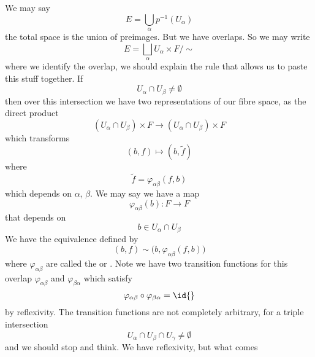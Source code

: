 We may say
\begin{equation}
E=\bigcup_{\alpha}p^{-1}(U_{\alpha})
\end{equation}
the total space is the union of preimages. But we have
overlaps. So we may write
\begin{equation}
E=\bigsqcup_{\alpha}U_{\alpha}\times F/\sim
\end{equation}
where we identify the overlap, we should explain the rule that
allows us to paste this stuff together. If
\begin{equation}
U_{\alpha}\cap U_{\beta}\not=\emptyset
\end{equation}
then over this intersection we have two representations of our
fibre space, as the direct product
\begin{equation}
(U_{\alpha}\cap U_{\beta})\times F\to (U_{\alpha}\cap U_{\beta})\times F
\end{equation}
which transforms
\begin{equation}
(b,f)\mapsto (b,\widetilde{f})
\end{equation}
where
\begin{equation}
\widetilde{f}=\varphi_{\alpha\beta}(f,b)
\end{equation}
which depends on $\alpha$, $\beta$. We may say  we have a map
\begin{equation}
\varphi_{\alpha\beta}(b)\colon F\to F
\end{equation}
that depends on 
\begin{equation}
b\in U_{\alpha}\cap U_{\beta}
\end{equation}
We have the equivalence defined by
\begin{equation}
(b,f)\sim\big(b,\varphi_{\alpha\beta}(f,b)\big)
\end{equation}
where $\varphi_{\alpha\beta}$ are called the  or . Note we have two
transition functions for this overlap $\varphi_{\alpha\beta}$ and
$\varphi_{\beta\alpha}$ which satisfy
\begin{equation}
\varphi_{\alpha\beta}\circ\varphi_{\beta\alpha}=\id{}
\end{equation}
by reflexivity. The transition functions are not completely
arbitrary, for a triple intersection 
\begin{equation}
U_{\alpha}\cap U_{\beta}\cap U_{\gamma}\not=\emptyset
\end{equation}
and we should stop and think. We have reflexivity, but what comes
